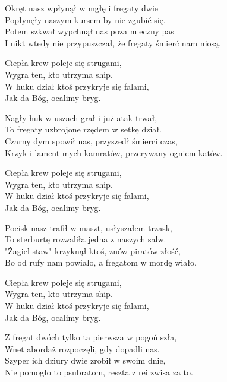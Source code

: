 \begin{text}
   
    Okręt nasz wpłynął w mgłę i fregaty dwie\\
    Popłynęły naszym kursem by nie zgubić się.\\
    Potem szkwał wypchnął nas poza mleczny pas\\
    I nikt wtedy nie przypuszczał, że fregaty śmierć nam niosą.


    \vin Ciepła krew poleje się strugami,\\
    \vin Wygra ten, kto utrzyma ship.\\
    \vin W huku dział ktoś przykryje się falami,\\
    \vin Jak da Bóg, ocalimy bryg.

    Nagły huk w uszach grał i już atak trwał,\\
    To fregaty uzbrojone rzędem w setkę dział.\\
    Czarny dym spowił nas, przyszedł śmierci czas,\\
    Krzyk i lament mych kamratów, przerywany ogniem katów.

    \vin Ciepła krew poleje się strugami,\\
    \vin Wygra ten, kto utrzyma ship.\\
    \vin W huku dział ktoś przykryje się falami,\\
    \vin Jak da Bóg, ocalimy bryg.

    Pocisk nasz trafił w maszt, usłyszałem trzask,\\
    To sterburtę rozwaliła jedna z naszych salw.\\
    "Żagiel staw" krzyknął ktoś, znów piratów złość,\\
    Bo od rufy nam powiało, a fregatom w mordę wiało.

    \vin Ciepła krew poleje się strugami,\\
    \vin Wygra ten, kto utrzyma ship.\\
    \vin W huku dział ktoś przykryje się falami,\\
    \vin Jak da Bóg, ocalimy bryg.

    Z fregat dwóch tylko ta pierwsza w pogoń szła,\\
    Wnet abordaż rozpoczęli, gdy dopadli nas.\\
    Szyper ich dziury dwie zrobił w swoim dnie,\\
    Nie pomogło to psubratom, reszta z rei zwisa za to.


\end{text}
